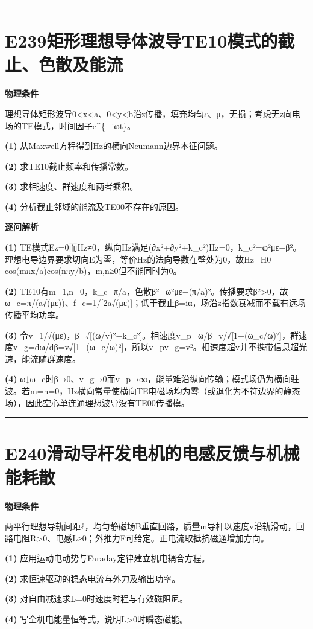 \documentclass[UTF8,a4paper,11pt,oneside,openany]{ctexbook}
\begin{document}
\par\bigskip\hrule\bigskip
\section*{E239\quad 矩形理想导体波导TE10模式的截止、色散及能流}
\textbf{物理条件}\par 理想导体矩形波导0<x<a、0<y<b沿z传播，填充均匀ε、μ，无损；考虑无z向电场的TE模式，时间因子e\textasciicircum{}\{−iωt\}。
\par\noindent\textbf{(1)} 从Maxwell方程得到Hz的横向Neumann边界本征问题。
\par\noindent\textbf{(2)} 求TE10截止频率和传播常数。
\par\noindent\textbf{(3)} 求相速度、群速度和两者乘积。
\par\noindent\textbf{(4)} 分析截止邻域的能流及TE00不存在的原因。

\par\medskip\noindent\textbf{逐问解析}
\par\noindent\textbf{(1)} TE模式Ez=0而Hz≠0，纵向Hz满足(∂x²+∂y²+k\_c²)Hz=0，k\_c²=ω²με−β²。理想电导边界要求切向E为零，等价Hz的法向导数在壁处为0，故Hz=H0 cos(mπx/a)cos(nπy/b)，m,n≥0但不能同时为0。
\par\noindent\textbf{(2)} TE10有m=1,n=0，k\_c=π/a，色散β²=ω²με−(π/a)²。传播要求β²>0，故ω\_c=π/(a√(με))、f\_c=1/[2a√(με)]；低于截止β=iα，场沿z指数衰减而不载有远场传播平均功率。
\par\noindent\textbf{(3)} 令v=1/√(με)，β=√[(ω/v)²−k\_c²]。相速度v\_p=ω/β=v/√[1−(ω\_c/ω)²]，群速度v\_g=dω/dβ=v√[1−(ω\_c/ω)²]，所以v\_pv\_g=v²。相速度超v并不携带信息超光速，能流随群速度。
\par\noindent\textbf{(4)} ω↓ω\_c时β→0、v\_g→0而v\_p→∞，能量难沿纵向传输；模式场仍为横向驻波。若m=n=0，Hz横向常量使横向TE电磁场均为零（或退化为不符边界的静态场），因此空心单连通理想波导没有TE00传播模。

\par\bigskip\hrule\bigskip
\section*{E240\quad 滑动导杆发电机的电感反馈与机械能耗散}
\textbf{物理条件}\par 两平行理想导轨间距ℓ，均匀静磁场B垂直回路，质量m导杆以速度v沿轨滑动，回路电阻R>0、电感L≥0；外推力F可给定。正电流取抵抗磁通增加方向。
\par\noindent\textbf{(1)} 应用运动电动势与Faraday定律建立机电耦合方程。
\par\noindent\textbf{(2)} 求恒速驱动的稳态电流与外力及输出功率。
\par\noindent\textbf{(3)} 对自由减速求L=0时速度时程与有效磁阻尼。
\par\noindent\textbf{(4)} 写全机电能量恒等式，说明L>0时瞬态磁能。
\end{document}

